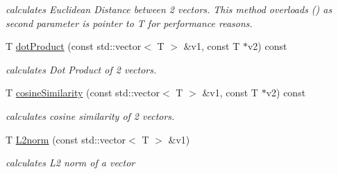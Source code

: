 \begin{DoxyCompactItemize}
\begin{DoxyCompactList}\small\item\em calculates Euclidean Distance between 2 vectors. This method overloads () as second parameter is pointer to T for performance reasons. \end{DoxyCompactList}\item 
T \mbox{\hyperlink{class_s_o_m_aae16d4dfa51332b631c314dc82ef9145}{dot\+Product}} (const std\+::vector$<$ T $>$ \&v1, const T $\ast$v2) const
\begin{DoxyCompactList}\small\item\em calculates Dot Product of 2 vectors. \end{DoxyCompactList}\item 
T \mbox{\hyperlink{class_s_o_m_a577f703f087e87c5d8580665540a9833}{cosine\+Similarity}} (const std\+::vector$<$ T $>$ \&v1, const T $\ast$v2) const
\begin{DoxyCompactList}\small\item\em calculates cosine similarity of 2 vectors. \end{DoxyCompactList}\item 
T \mbox{\hyperlink{class_s_o_m_a9dbf0a67e0afcc612ff68a7f287c8450}{L2norm}} (const std\+::vector$<$ T $>$ \&v1)
\begin{DoxyCompactList}\small\item\em calculates L2 norm of a vector \end{DoxyCompactList}\end{DoxyCompactItemize}
